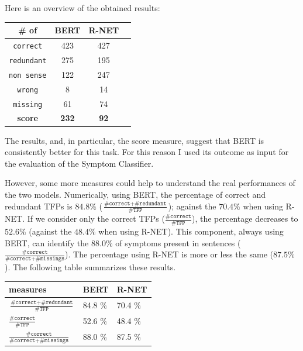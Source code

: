 Here is an overview of the obtained results:


\begin{center}
 \begin{tabular}{| c | c | c | c |} 
 \hline
 \# of & BERT & R-NET \\ [0.5ex] 
 \hline\hline
 \rowcolor{green}
 \texttt{correct} & 423 & 427 \\ 
 \hline
 \rowcolor{lightgreen}
 \texttt{redundant} & 275 & 195 \\
 \hline
 \rowcolor{red}
 \texttt{non sense} & 122 & 247 \\
 \hline
 \rowcolor{red}
 \texttt{wrong} & 8 & 14 \\
 \hline
 \rowcolor{red}
 \texttt{missing} & 61 & 74 \\
 \hline
 \textbf{score} & \textbf{232} & \textbf{92} \\ 
 \hline
\end{tabular}
\end{center}

The results, and, in particular, the score measure, suggest that BERT is consistently better for this task. For this reason I used its outcome as input for the evaluation of the Symptom Classifier.

However, some more measures could help to understand the real performances of the two models. Numerically, using BERT, the percentage of correct and redundant TFPs is $84.8 \%$ ($\frac{\texttt{\#correct} + \texttt{\#redundant}}{\texttt{\#TFP}}$); against the $70.4 \%$ when using R-NET. If we consider only the correct TFPs ($\frac{\texttt{\#correct}}{\texttt{\#TFP}}$), the percentage decreases to $52.6 \%$ (against the $48.4 \%$ when using R-NET). This component, always using BERT, can identify the $88.0 \%$ of symptoms present in sentences ($\frac{\texttt{\#correct}}{\texttt{\#correct} + \texttt{\#missings}}$). The percentage using R-NET is more or less the same ($87.5 \%$). The following table summarizes these results.

\begin{center}
 \begin{tabular}{| C | D | D |}
 \hline
 measures & BERT & R-NET \\ [1ex] 
 \hline\hline
 \texttt{$\frac{\texttt{\#correct} + \texttt{\#redundant}}{\texttt{\#TFP}}$} & 84.8 \% & 70.4 \% \\[1ex]
 \hline
 \texttt{$\frac{\texttt{\#correct}}{\texttt{\#TFP}}$} & 52.6 \% & 48.4 \% \\[1ex]
 \hline
 \texttt{$\frac{\texttt{\#correct}}{\texttt{\#correct} + \texttt{\#missings}}$} & 88.0 \% & 87.5 \% \\[1ex]
 \hline
\end{tabular}
\end{center}

